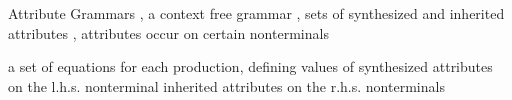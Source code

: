 \documentclass[notes,11pt,aspectratio=169]{beamer}
\newcommand{\ableC}{\textsc{ableC}}
\begin{document}

\begin{frame}{Attribute Grammars}
\biA
\x {}, a context free grammar
\x {}, sets of synthesized and inherited attributes
\x {}, attributes occur on certain nonterminals
\x {}

  \vskip 0.25cm

   a set of equations for each production, defining values of
  \biA
   \x synthesized attributes on the l.h.s. nonterminal
   \x inherited attributes on the r.h.s. nonterminals
  \ei
\ei
\end{frame}
\end{document}
